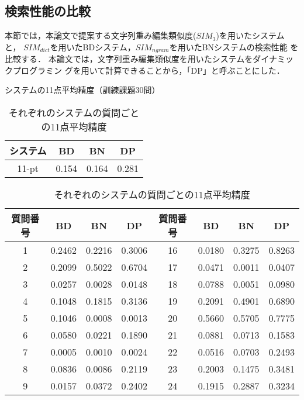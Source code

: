 \subsection{検索性能の比較}

本節では，本論文で提案する文字列重み編集類似度($SIM_3$)を用いたシステムと，
$SIM_{dict}$を用いたBDシステム，$SIM_{ngram}$を用いたBNシステムの検索性能
を比較する．
本論文では，文字列重み編集類似度を用いたシステムをダイナミックプログラミン
グを用いて計算できることから，「DP」と呼ぶことにした．

\begin{table}[htb]
\caption{システムの11点平均精度（訓練課題30問）}
\vspace{-1.2em}
\label{tab:all-prec}
\begin{center}
\begin{tabular}{|c||c|c|c|} \hline
システム & {\bf BD} & {\bf BN} & {\bf DP}\\\hline\hline
11-pt & 0.154 & 0.164 & 0.281 \\\hline
\end{tabular}
\vspace{-0.3em}
\end{center}
\caption{それぞれのシステムの質問ごとの11点平均精度}
\vspace{-1.2em}
\label{tab:precision}
\begin{center}
\hspace*{-2em}
\begin{tabular}{|c||c|c|c||c||c|c|c|}\hline
{\bf 質問番号}&{\bf BD}&{\bf BN}&{\bf DP}&
{\bf 質問番号}&{\bf BD}&{\bf BN}&{\bf DP}\\\hline\hline
 1 & 0.2462 & 0.2216 & 0.3006 & 16 & 0.0180 & 0.3275 & 0.8263\\ \hline
 2 & 0.2099 & 0.5022 & 0.6704 & 17 & 0.0471 & 0.0011 & 0.0407\\ \hline
 3 & 0.0257 & 0.0028 & 0.0148 & 18 & 0.0788 & 0.0051 & 0.0980\\ \hline
 4 & 0.1048 & 0.1815 & 0.3136 & 19 & 0.2091 & 0.4901 & 0.6890\\ \hline
 5 & 0.1046 & 0.0008 & 0.0013 & 20 & 0.5660 & 0.5705 & 0.7775\\ \hline
 6 & 0.0580 & 0.0221 & 0.1890 & 21 & 0.0881 & 0.0713 & 0.1583\\ \hline
 7 & 0.0005 & 0.0010 & 0.0024 & 22 & 0.0516 & 0.0703 & 0.2493\\ \hline
 8 & 0.0836 & 0.0086 & 0.2119 & 23 & 0.2003 & 0.1475 & 0.3481\\ \hline
 9 & 0.0157 & 0.0372 & 0.2402 & 24 & 0.1915 & 0.2887 & 0.3234\\ \hline

\end{tabular}
\end{center}
\end{table}
